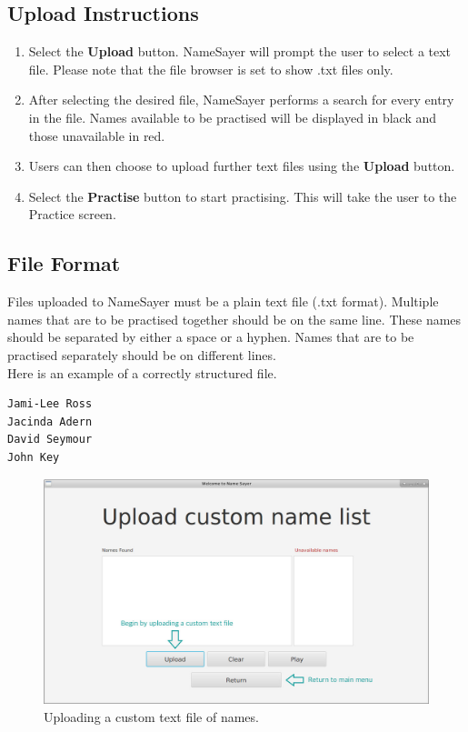\documentclass{article}
\begin{document}
\subsection{Upload Instructions}

\begin{enumerate}
	\item Select the \textbf{Upload} button. NameSayer will prompt the user to
	select a text file. Please note that the file browser is set to show .txt
	files only.

	\item After selecting the desired file, NameSayer performs a search for
	every entry in the file. Names available to be practised will be displayed
	in black and those unavailable in red.

	\item Users can then choose to upload further text files using the
	\textbf{Upload} button.

	\item Select the \textbf{Practise} button to start practising. This will
	take the user to the Practice screen.

\end{enumerate}

\subsection{File Format}
Files uploaded to NameSayer must be a plain text file (.txt format).  Multiple
names that are to be practised together should be on the  same line. These names
should be separated by either a space or a hyphen. Names that are to be
practised separately should be on different lines. \\

Here is an example of a correctly structured file.
\begin{verbatim}
Jami-Lee Ross
Jacinda Adern
David Seymour
John Key
\end{verbatim}

\begin{figure}[H]
	\includegraphics[width=\textwidth]{images/5_upload_empty.jpg}
	\caption{Uploading a custom text file of names.}
	\label{uploadempty}
\end{figure}
\end{document}
